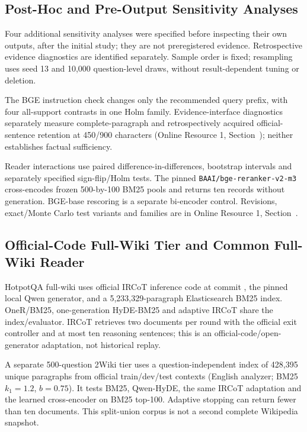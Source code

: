 \subsection{Post-Hoc and Pre-Output Sensitivity Analyses}
\label{sec:review_driven_sensitivity}

Four additional sensitivity analyses were specified before inspecting their own outputs, after the initial study; they are not preregistered evidence. Retrospective evidence diagnostics are identified separately. Sample order is fixed; resampling uses seed 13 and 10,000 question-level draws, without result-dependent tuning or deletion.

The BGE instruction check changes only the recommended query prefix, with four all-support contrasts in one Holm family. Evidence-interface diagnostics separately measure complete-paragraph and retrospectively acquired official-sentence retention at 450/900 characters (Online Resource 1, Section~); neither establishes factual sufficiency.

Reader interactions use paired difference-in-differences, bootstrap intervals and separately specified sign-flip/Holm tests. The pinned \texttt{BAAI/bge-reranker-v2-m3} cross-encodes frozen 500-by-100 BM25 pools and returns ten records without generation. BGE-base rescoring is a separate bi-encoder control. Revisions, exact/Monte Carlo test variants and families are in Online Resource 1, Section~.

\subsection{Official-Code Full-Wiki Tier and Common Full-Wiki Reader}
\label{sec:fullwiki_common_reader}

HotpotQA full-wiki uses official IRCoT inference code at commit , the pinned local Qwen generator, and a 5,233,329-paragraph Elasticsearch BM25 index. OneR/BM25, one-generation HyDE-BM25 and adaptive IRCoT share the index/evaluator. IRCoT retrieves two documents per round with the official exit controller and at most ten reasoning sentences; this is an official-code/open-generator adaptation, not historical replay.

A separate 500-question 2Wiki tier uses a question-independent index of 428,395 unique paragraphs from official train/dev/test contexts (English analyzer; BM25 $k_1=1.2$, $b=0.75$). It tests BM25, Qwen-HyDE, the same IRCoT adaptation and the learned cross-encoder on BM25 top-100. Adaptive stopping can return fewer than ten documents. This split-union corpus is not a second complete Wikipedia snapshot.

